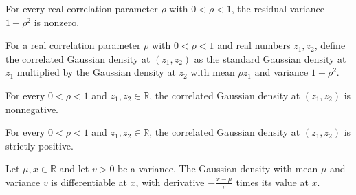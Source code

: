 \begin{theorem}
\label{FABL.correlationResidualVariance_ne_zero}
\leanok
{}
For every real correlation parameter $\rho$ with $0<\rho<1$, the residual variance
$1-\rho^2$ is nonzero.
\end{theorem}

\begin{definition}
\label{FABL.correlatedGaussianDensity}
\leanok
{}
For a real correlation parameter $\rho$ with $0<\rho<1$ and real numbers $z_1,z_2$,
define the correlated Gaussian density at $(z_1,z_2)$ as the standard Gaussian density
at $z_1$ multiplied by the Gaussian density at $z_2$ with mean $\rho z_1$ and variance
$1-\rho^2$.
\end{definition}

\begin{theorem}
\label{FABL.correlatedGaussianDensity_nonneg}
\leanok
{}
For every $0<\rho<1$ and $z_1,z_2\in\mathbb{R}$, the correlated Gaussian density at
$(z_1,z_2)$ is nonnegative.
\end{theorem}

\begin{theorem}
\label{FABL.correlatedGaussianDensity_pos}
\leanok
{}
For every $0<\rho<1$ and $z_1,z_2\in\mathbb{R}$, the correlated Gaussian density at
$(z_1,z_2)$ is strictly positive.
\end{theorem}

\begin{theorem}
\label{FABL.hasDerivAt_gaussianPDFReal_posVariance}
\leanok
{}
Let $\mu,x\in\mathbb R$ and let $v>0$ be a variance. The Gaussian density with
mean $\mu$ and variance $v$ is differentiable at $ x$, with derivative
$-\frac{x-\mu}{v}$ times its value at $x$.
\end{theorem}

